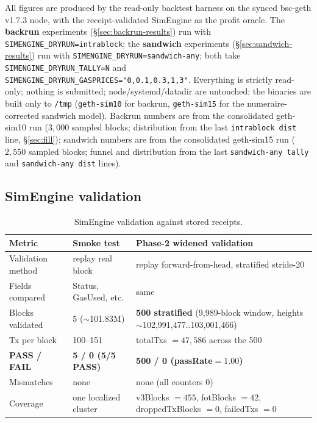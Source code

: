 \documentclass[11pt]{article}
\newcommand{\code}[1]{\texttt{#1}}
\begin{document}
All figures are produced by the read-only backtest harness on the synced bsc-geth
v1.7.3 node, with the receipt-validated SimEngine as the profit oracle. The
\textbf{backrun} experiments (\S\ref{sec:backrun-results}) run with
\code{SIMENGINE\_DRYRUN=intrablock}; the \textbf{sandwich} experiments
(\S\ref{sec:sandwich-results}) run with \code{SIMENGINE\_DRYRUN=sandwich-any}; both
take \code{SIMENGINE\_DRYRUN\_TALLY=N} and
\code{SIMENGINE\_DRYRUN\_GASPRICES="0,0.1,0.3,1,3"}. Everything is strictly
read-only; nothing is submitted; node/systemd/datadir are untouched; the binaries are
built only to \code{/tmp} (\code{geth-sim10} for backrun, \code{geth-sim15} for the
numeraire-corrected sandwich model). Backrun numbers are from the consolidated
geth-sim10 run ($3{,}000$ sampled blocks; distribution from the last
\code{intrablock dist} line, \S\ref{sec:fill}); sandwich numbers are from the
consolidated geth-sim15 run ($2{,}550$ sampled blocks; funnel and distribution from
the last \code{sandwich-any tally} and \code{sandwich-any dist} lines).

\subsection{SimEngine validation}
\begin{table}[h]\centering
\caption{SimEngine validation against stored receipts.}\label{tab:val}
\begin{tabular}{lll}
\toprule
Metric & Smoke test & \textbf{Phase-2 widened validation} \\
\midrule
Validation method & replay real block & replay forward-from-head, stratified stride-20 \\
Fields compared & Status, GasUsed, etc. & same \\
Blocks validated & 5 ($\sim$101.83M) & \textbf{500 stratified} (9{,}989-block window, heights $\sim$102{,}991{,}477..103{,}001{,}466) \\
Tx per block & 100--151 & totalTxs $=47{,}586$ across the 500 \\
\textbf{PASS / FAIL} & \textbf{5 / 0 (5/5 PASS)} & \textbf{500 / 0 (passRate$=1.00$)} \\
Mismatches & none & none (all counters 0) \\
Coverage & one localized cluster & v3Blocks $=455$, fotBlocks $=42$, droppedTxBlocks $=0$, failedTxs $=0$ \\
\bottomrule
\end{tabular}
\end{table}
\end{document}
